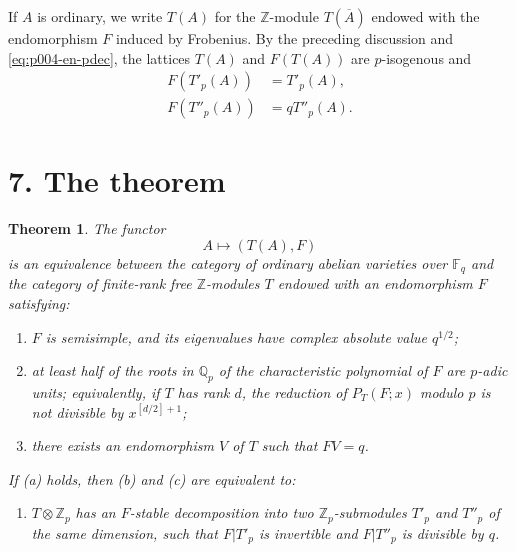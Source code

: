 \documentclass[12pt]{article}
\newcommand{\Z}{\mathbb{Z}}
\newcommand{\Q}{\mathbb{Q}}
\newcommand{\F}{\mathbb{F}}
\theoremstyle{plain}
\newtheorem{theorem}{Theorem}
\theoremstyle{definition}
\theoremstyle{remark}
\begin{document}
If $A$ is ordinary, we write $T(A)$ for the $\Z$-module $T(\overline A)$ endowed with the endomorphism $F$ induced by Frobenius. By the preceding discussion and \eqref{eq:p004-en-pdec}, the lattices $T(A)$ and $F(T(A))$ are $p$-isogenous and
\begin{align}
 F(T'_p(A))&=T'_p(A),\label{eq:p004-en-61}\\
 F(T''_p(A))&=qT''_p(A).\label{eq:p004-en-62}
\end{align}

\section*{7. The theorem}
\begin{theorem}
The functor
\[
 A\longmapsto (T(A),F)
\]
is an equivalence between the category of ordinary abelian varieties over $\F_q$ and the category of finite-rank free $\Z$-modules $T$ endowed with an endomorphism $F$ satisfying:
\begin{enumerate}[label=(\alph*)]
\item $F$ is semisimple, and its eigenvalues have complex absolute value $q^{1/2}$;
\item at least half of the roots in $\Q_p$ of the characteristic polynomial of $F$ are $p$-adic units; equivalently, if $T$ has rank $d$, the reduction of $P_T(F;x)$ modulo $p$ is not divisible by $x^{[d/2]+1}$;
\item there exists an endomorphism $V$ of $T$ such that $FV=q$.
\end{enumerate}
If (a) holds, then (b) and (c) are equivalent to:
\begin{enumerate}[label=(\alph*),start=4]
\item $T\otimes\Z_p$ has an $F$-stable decomposition into two $\Z_p$-submodules $T'_p$ and $T''_p$ of the same dimension, such that $F|T'_p$ is invertible and $F|T''_p$ is divisible by $q$.
\end{enumerate}
\end{theorem}
\end{document}
